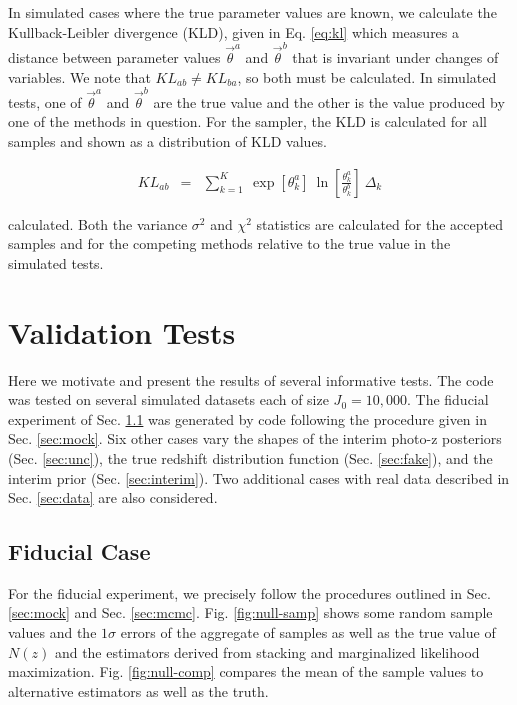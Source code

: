 \documentclass[preprint]{aastex}
\begin{document}
In simulated cases where the true parameter values are known, we calculate the 
Kullback-Leibler divergence (KLD), given in Eq. \ref{eq:kl} which measures a 
distance between parameter values $\vec{\theta}^{a}$ and $\vec{\theta}^{b}$ 
that is invariant under changes of variables.  We note that $KL_{ab}\neq 
KL_{ba}$, so both must be calculated.  In simulated tests, one of 
$\vec{\theta}^{a}$ and $\vec{\theta}^{b}$ are the true value and the other is 
the value produced by one of the methods in question.  For the sampler, the KLD 
is calculated for all samples and shown as a distribution of KLD values.

\begin{eqnarray}
\label{eq:kl}
KL_{ab} &=& \sum_{k=1}^{K}\ \exp[\theta_{k}^{a}]\ 
\ln\left[\frac{\theta_{k}^{a}}{\theta_{k}^{b}}\right]\ \Delta_{k}
\end{eqnarray}

calculated.  Both the variance $\sigma^{2}$ and $\chi^{2}$ statistics are 
calculated for the accepted samples and for the competing methods relative to 
the true value in the simulated tests.
%

\clearpage
\section{Validation Tests}
\label{sec:valid}

Here we motivate and present the results of several informative tests.  The 
code was tested on several simulated datasets each of size $J_{0}=10,000$.  The 
fiducial experiment of Sec. \ref{sec:null} was generated by code following the 
procedure given in Sec. \ref{sec:mock}.  Six other cases vary the shapes of the 
interim photo-z posteriors (Sec. \ref{sec:unc}), the true redshift distribution 
function (Sec. \ref{sec:fake}), and the interim prior (Sec. \ref{sec:interim}). 
 Two additional cases with real data described in Sec. \ref{sec:data} are also 
considered.

\clearpage
\subsection{Fiducial Case}
\label{sec:null}

For the fiducial experiment, we precisely follow the procedures outlined in 
Sec. \ref{sec:mock} and Sec. \ref{sec:mcmc}.  Fig. \ref{fig:null-samp} shows 
some random sample values and the $1\sigma$ errors of the aggregate of samples 
as well as the true value of $N(z)$ and the estimators derived from stacking 
and marginalized likelihood maximization.  Fig. \ref{fig:null-comp} compares 
the mean of the sample values to alternative estimators as well as the truth.
\end{document}
